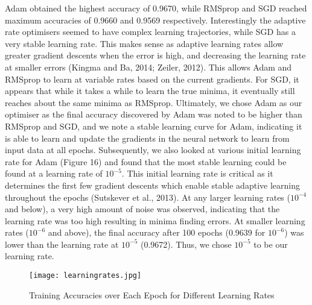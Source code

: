\documentclass{article}
\begin{document}
Adam obtained the highest accuracy of 0.9670, while RMSprop and SGD reached maximum accuracies of 0.9660 and 0.9569 respectively. Interestingly the adaptive rate optimisers seemed to have complex learning trajectories, while SGD has a very stable learning rate. This makes sense as adaptive learning rates allow greater gradient descents when the error is high, and decreasing the learning rate at smaller errors (Kingma and Ba, 2014; Zeiler, 2012). This allows Adam and RMSprop to learn at variable rates based on the current gradients. For SGD, it appears that while it takes a while to learn the true minima, it eventually still reaches about the same minima as RMSprop. Ultimately, we chose Adam as our optimiser as the final accuracy discovered by Adam was noted to be higher than RMSprop and SGD, and we note a stable learning curve for Adam, indicating it is able to learn and update the gradients in the neural network to learn from input data at all epochs. Subsequently, we also looked at various initial learning rate for Adam (Figure 16) and found that the most stable learning could be found at a learning rate of $10^{-5}$. This initial learning rate is critical as it determines the first few gradient descents which enable stable adaptive learning throughout the epochs (Sutskever et al., 2013). At any larger learning rates ($10^{-4}$ and below), a very high amount of noise was observed, indicating that the learning rate was too high resulting in minima finding errors. At smaller learning rates ($10^{-6}$ and above), the final accuracy after 100 epochs (0.9639 for $10^{-6}$) was lower than the learning rate at $10^{-5}$ (0.9672). Thus, we chose $10^{-5}$ to be our learning rate.
\begin{figure}[H]
\texttt{[image: learningrates.jpg]}
\centering
\caption{Training Accuracies over Each Epoch for Different Learning Rates}
\end{figure}
\end{document}
